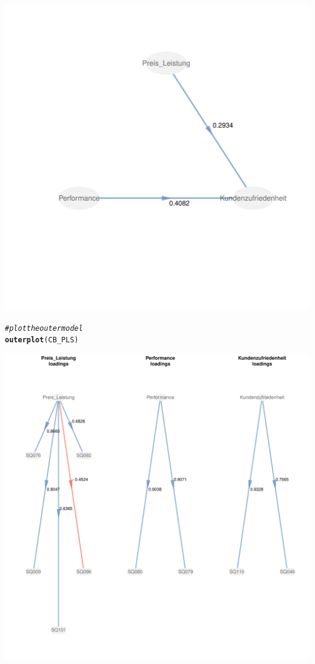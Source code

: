 \documentclass{article}\usepackage[]{graphicx}\usepackage[]{color}
\makeatletter
\def\maxwidth{ %
  \ifdim\Gin@nat@width>\linewidth
    \linewidth
  \else
    \Gin@nat@width
  \fi
}
\newcommand{\hlcom}[1]{\textcolor[rgb]{0.678,0.584,0.686}{\textit{#1}}}%
\newcommand{\hlstd}[1]{\textcolor[rgb]{0.345,0.345,0.345}{#1}}%
\newcommand{\hlkwd}[1]{\textcolor[rgb]{0.737,0.353,0.396}{\textbf{#1}}}%
\newenvironment{kframe}{%
 \def\at@end@of@kframe{}%
 \ifinner\ifhmode%
  \def\at@end@of@kframe{\end{minipage}}%
  \begin{minipage}{\columnwidth}%
 \fi\fi%
 \def\FrameCommand##1{\hskip\@totalleftmargin \hskip-\fboxsep
 \colorbox{shadecolor}{##1}\hskip-\fboxsep
     \hskip-\linewidth \hskip-\@totalleftmargin \hskip\columnwidth}%
 \MakeFramed {\advance\hsize-\width
   \@totalleftmargin\z@ \linewidth\hsize
   \@setminipage}}%
 {\par\unskip\endMakeFramed%
 \at@end@of@kframe}
\newenvironment{knitrout}{}{} %
\makeatother
\begin{document}
\begin{knitrout}
\begin{kframe}
\begin{alltt}
\end{alltt}
\end{kframe}
\includegraphics[width=\maxwidth]{figure/zoo1} 
\begin{kframe}\begin{alltt}
\hlcom{#plot the outer model}
\hlkwd{outerplot}\hlstd{(CB_PLS)}
\end{alltt}
\end{kframe}
\includegraphics[width=\maxwidth]{figure/zoo2} 

\end{knitrout}
\end{document}
